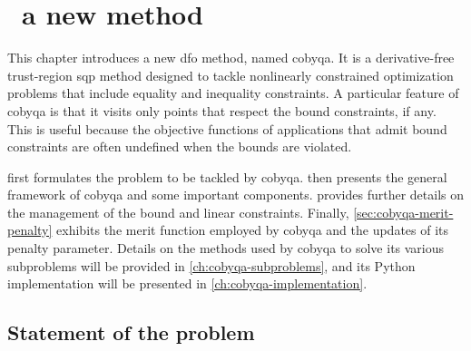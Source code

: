 %
%
%
\chapter{ \textemdash\ a new  method}
\label{ch:cobyqa-introduction}

This chapter introduces a new \gls{dfo} method, named \gls{cobyqa}.
It is a derivative-free trust-region \gls{sqp} method designed to tackle nonlinearly constrained optimization problems that include equality and inequality constraints.
A particular feature of \gls{cobyqa} is that it visits only points that respect the bound constraints, if any.
This is useful because the objective functions of applications that admit bound constraints are often undefined when the bounds are violated.

 first formulates the problem to be tackled by \gls{cobyqa}.
 then presents the general framework of \gls{cobyqa} and some important components.
 provides further details on the management of the bound and linear constraints.
Finally, \cref{sec:cobyqa-merit-penalty} exhibits the merit function employed by \gls{cobyqa} and the updates of its penalty parameter.
Details on the methods used by \gls{cobyqa} to solve its various subproblems will be provided in \cref{ch:cobyqa-subproblems}, and its Python implementation will be presented in \cref{ch:cobyqa-implementation}.

\section{Statement of the problem}
\label{sec:cobyqa-statement}

